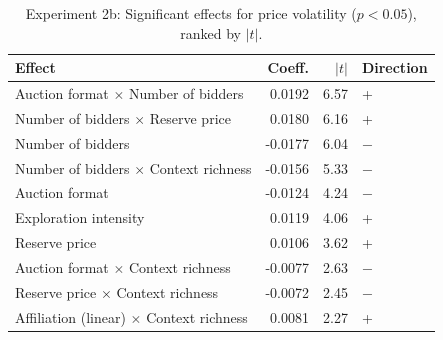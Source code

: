 \begin{table}[H]
\centering
\caption{Experiment 2b: Significant effects for price volatility ($p < 0.05$), ranked by $|t|$.}
\label{tab:exp2b_ranked_vol}
\begin{tabular}{lrrl}
\toprule
\textbf{Effect} & \textbf{Coeff.} & \textbf{$|t|$} & \textbf{Direction} \\
\midrule
Auction format $\times$ Number of bidders & 0.0192 & 6.57 & + \\
Number of bidders $\times$ Reserve price & 0.0180 & 6.16 & + \\
Number of bidders & -0.0177 & 6.04 & $-$ \\
Number of bidders $\times$ Context richness & -0.0156 & 5.33 & $-$ \\
Auction format & -0.0124 & 4.24 & $-$ \\
Exploration intensity & 0.0119 & 4.06 & + \\
Reserve price & 0.0106 & 3.62 & + \\
Auction format $\times$ Context richness & -0.0077 & 2.63 & $-$ \\
Reserve price $\times$ Context richness & -0.0072 & 2.45 & $-$ \\
Affiliation (linear) $\times$ Context richness & 0.0081 & 2.27 & + \\
\bottomrule
\end{tabular}
\end{table}
